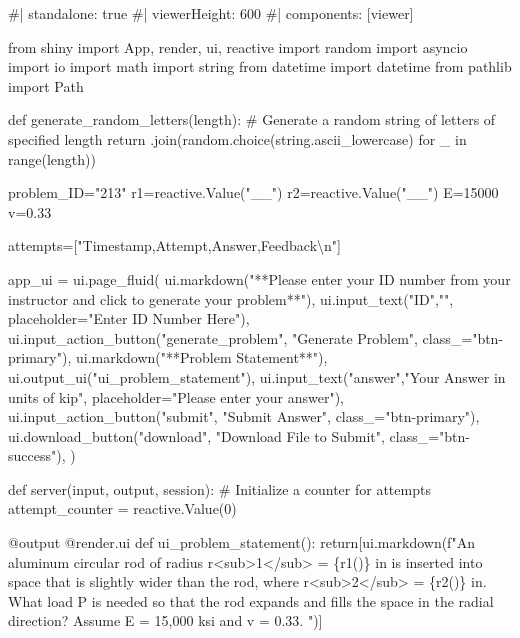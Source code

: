\documentclass[
  letterpaper,
  DIV=11,
  numbers=noendperiod]{scrreprt}
\newenvironment{Shaded}{\begin{snugshade}}{\end{snugshade}}
\newcommand{\NormalTok}[1]{\textcolor[rgb]{0.00,0.23,0.31}{#1}}
\begin{document}
\begin{Shaded}
\begin{Highlighting}[]
\NormalTok{\#| standalone: true}
\NormalTok{\#| viewerHeight: 600}
\NormalTok{\#| components: [viewer]}

\NormalTok{from shiny import App, render, ui, reactive}
\NormalTok{import random}
\NormalTok{import asyncio}
\NormalTok{import io}
\NormalTok{import math}
\NormalTok{import string}
\NormalTok{from datetime import datetime}
\NormalTok{from pathlib import Path}

\NormalTok{def generate\_random\_letters(length):}
\NormalTok{    \# Generate a random string of letters of specified length}
\NormalTok{    return \textquotesingle{}\textquotesingle{}.join(random.choice(string.ascii\_lowercase) for \_ in range(length)) }

\NormalTok{problem\_ID="213"}
\NormalTok{r1=reactive.Value("\_\_")}
\NormalTok{r2=reactive.Value("\_\_")}
\NormalTok{E=15000}
\NormalTok{v=0.33}


\NormalTok{attempts=["Timestamp,Attempt,Answer,Feedback\textbackslash{}n"]}

\NormalTok{app\_ui = ui.page\_fluid(}
\NormalTok{    ui.markdown("**Please enter your ID number from your instructor and click to generate your problem**"),}
\NormalTok{    ui.input\_text("ID","", placeholder="Enter ID Number Here"),}
\NormalTok{    ui.input\_action\_button("generate\_problem", "Generate Problem", class\_="btn{-}primary"),}
\NormalTok{    ui.markdown("**Problem Statement**"),}
\NormalTok{    ui.output\_ui("ui\_problem\_statement"),}
\NormalTok{    ui.input\_text("answer","Your Answer in units of kip", placeholder="Please enter your answer"),}
\NormalTok{    ui.input\_action\_button("submit", "Submit Answer", class\_="btn{-}primary"),}
\NormalTok{    ui.download\_button("download", "Download File to Submit", class\_="btn{-}success"),}
\NormalTok{)}


\NormalTok{def server(input, output, session):}
\NormalTok{    \# Initialize a counter for attempts}
\NormalTok{    attempt\_counter = reactive.Value(0)}

\NormalTok{    @output}
\NormalTok{    @render.ui}
\NormalTok{    def ui\_problem\_statement():}
\NormalTok{        return[ui.markdown(f"An aluminum circular rod of radius r\textless{}sub\textgreater{}1\textless{}/sub\textgreater{} = \{r1()\} in is inserted into space that is slightly wider than the rod, where r\textless{}sub\textgreater{}2\textless{}/sub\textgreater{} = \{r2()\} in. What load P is needed so that the rod expands and fills the space in the radial direction? Assume E = 15,000 ksi and v = 0.33. ")]}
    

\end{Highlighting}
\end{Shaded}
\end{document}
